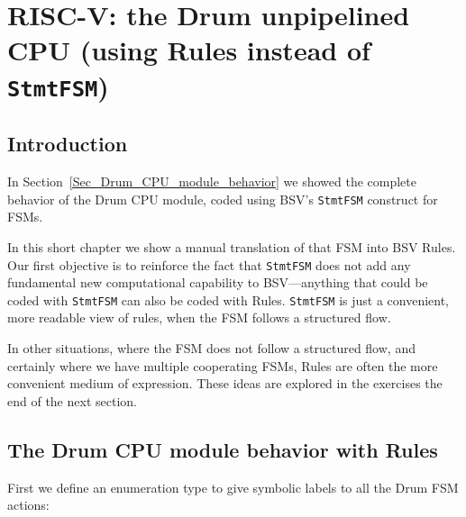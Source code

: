 

\chapter{RISC-V: the Drum unpipelined CPU (using Rules instead of {\tt StmtFSM})}


\setcounter{page}{1}
\renewcommand{\thepage}{\arabic{chapter}-\arabic{page}}

\label{ch_Drum_Rules}


\section{Introduction}

In Section~\ref{Sec_Drum_CPU_module_behavior} we showed the complete
behavior of the Drum CPU module, coded using BSV's \verb|StmtFSM|
construct for FSMs.

In this short chapter we show a manual translation of that FSM into
BSV Rules.  Our first objective is to reinforce the fact that
\verb|StmtFSM| does not add any fundamental new computational
capability to BSV---anything that could be coded with \verb|StmtFSM|
can also be coded with Rules.  \verb|StmtFSM| is just a convenient,
more readable view of rules, when the FSM follows a structured flow.

In other situations, where the FSM does not follow a structured flow,
and certainly where we have multiple cooperating FSMs, Rules are often
the more convenient medium of expression.  These ideas are explored in
the exercises the end of the next section.


\section{The Drum CPU module behavior with Rules}

First we define an enumeration type to give symbolic labels to all the
Drum FSM actions:



